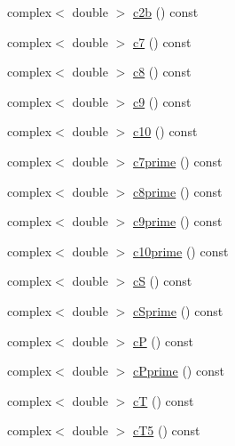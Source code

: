 \begin{DoxyCompactItemize}
\item 
complex$<$ double $>$ \hyperlink{structeos_1_1WilsonCoefficients_3_01BToS_01_4_a8bfd88e1ee202d67cf6ad3e22fd0e311}{c2b} () const 
\item 
complex$<$ double $>$ \hyperlink{structeos_1_1WilsonCoefficients_3_01BToS_01_4_aabbbd9922af280cfef8cf7a243e1c02e}{c7} () const 
\item 
complex$<$ double $>$ \hyperlink{structeos_1_1WilsonCoefficients_3_01BToS_01_4_ad1700818a303de24c0d9aba06b9428db}{c8} () const 
\item 
complex$<$ double $>$ \hyperlink{structeos_1_1WilsonCoefficients_3_01BToS_01_4_abd2db158ab9926a0f7be9f29ef16663f}{c9} () const 
\item 
complex$<$ double $>$ \hyperlink{structeos_1_1WilsonCoefficients_3_01BToS_01_4_a5a8db4cc5c486d0a77b968f1456446e3}{c10} () const 
\item 
complex$<$ double $>$ \hyperlink{structeos_1_1WilsonCoefficients_3_01BToS_01_4_a40dafdcff20076a5cf44d529ac664f09}{c7prime} () const 
\item 
complex$<$ double $>$ \hyperlink{structeos_1_1WilsonCoefficients_3_01BToS_01_4_abfc2ac642a0fd10464d843eb7ed8ebab}{c8prime} () const 
\item 
complex$<$ double $>$ \hyperlink{structeos_1_1WilsonCoefficients_3_01BToS_01_4_a633c2ff746cf0998286b396d5d6ad864}{c9prime} () const 
\item 
complex$<$ double $>$ \hyperlink{structeos_1_1WilsonCoefficients_3_01BToS_01_4_a5afdd05acb7cd08196aa402ed6ccd374}{c10prime} () const 
\item 
complex$<$ double $>$ \hyperlink{structeos_1_1WilsonCoefficients_3_01BToS_01_4_afb6218a0c941a2c158753e8977ceca2a}{cS} () const 
\item 
complex$<$ double $>$ \hyperlink{structeos_1_1WilsonCoefficients_3_01BToS_01_4_afee3b55a164362636ff1bdfcea0d869f}{cSprime} () const 
\item 
complex$<$ double $>$ \hyperlink{structeos_1_1WilsonCoefficients_3_01BToS_01_4_af5e99da02e53255077cdf53b315c0960}{cP} () const 
\item 
complex$<$ double $>$ \hyperlink{structeos_1_1WilsonCoefficients_3_01BToS_01_4_ab49d57e926919ae28d0780f8d9df644b}{cPprime} () const 
\item 
complex$<$ double $>$ \hyperlink{structeos_1_1WilsonCoefficients_3_01BToS_01_4_a36a8fb3dc528761824bcced340aecbae}{cT} () const 
\item 
complex$<$ double $>$ \hyperlink{structeos_1_1WilsonCoefficients_3_01BToS_01_4_af74fd634de725f21735e0ba308c4985d}{cT5} () const 
\end{DoxyCompactItemize}
